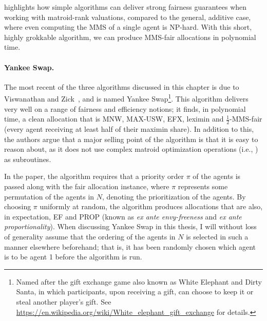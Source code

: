  highlights how simple algorithms can deliver strong fairness guarantees when working with matroid-rank valuations, compared to the general, additive case, where even computing the MMS of a single agent is NP-hard. With this short, highly grokkable algorithm, we can produce MMS-fair allocations in polynomial time.

\paragraph{Yankee Swap.} The most recent of the three algorithms discussed in this chapter is due to Viswanathan and Zick~\cite{viswanathan2023yankee}, and is named Yankee Swap\footnote{Named after the gift exchange game also known as White Elephant and Dirty Santa, in which participants, upon receiving a gift, can choose to keep it or steal another player's gift. See \href{https://en.wikipedia.org/wiki/White_elephant_gift_exchange}{https://en.wikipedia.org/wiki/White\_elephant\_gift\_exchange} for details.}. This algorithm delivers very well on a range of fairness and efficiency notions; it finds, in polynomial time, a clean allocation that is MNW, MAX-USW, EFX, leximin and $\frac{1}{2}$-MMS-fair (every agent receiving at least half of their maximin share). In addition to this, the authors argue that a major selling point of the algorithm is that it is easy to reason about, as it does not use complex matroid optimization operations (i.e., ) as subroutines.

In the paper, the algorithm requires that a priority order $\pi$ of the agents is passed along with the fair allocation instance, where $\pi$ represents some permutation of the agents in $N$, denoting the prioritization of the agents. By choosing $\pi$ uniformly at random, the algorithm produces allocations that are also, in expectation, EF and PROP (known as \textit{ex ante envy-freeness} and \textit{ex ante proportionality}). When discussing Yankee Swap in this thesis, I will without loss of generality assume that the ordering of the agents in $N$ is selected in such a manner elsewhere beforehand; that is, it has been randomly chosen which agent is to be agent 1 before the algorithm is run.

